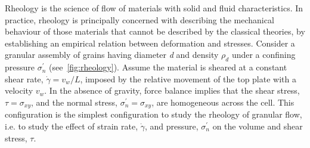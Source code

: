 Rheology is the science of flow of materials with solid and fluid 
characteristics. In practice, rheology is principally concerned with describing 
the mechanical behaviour of those materials that cannot be described by the 
classical theories, by establishing an empirical relation between deformation 
and stresses. Consider a granular assembly of grains having diameter 
\textit{d} and density $\rho_{\mathit{d}}$ under a confining pressure 
$\sigma_n^\prime$ (see~\cref{fig:rheology}). Assume the material is sheared 
at a constant shear rate, $\dot{\gamma} = \mathit{v}_{\mathit{w}} / 
\mathit{L}$, imposed by the relative movement of the top plate with a velocity 
$\mathit{v}_{\mathit{w}}$. In the absence of gravity, force balance implies 
that the shear stress, $\tau= \sigma_{\mathit{xy}}$, and the normal stress, 
$\sigma_n^\prime=\sigma_{\mathit{xy}}$, are homogeneous across the cell. This 
configuration is the simplest configuration to study the rheology of granular 
flow, i.e. to study the effect of strain rate, $\dot{\gamma}$, and 
pressure, $\sigma_n^\prime$ on the volume and shear stress, $\tau$. 

